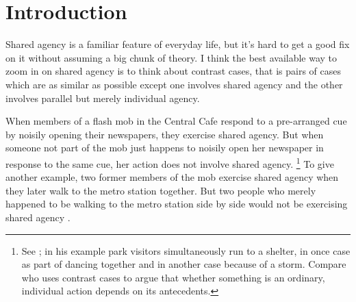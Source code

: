 \documentclass[12pt,\papersize]{extarticle}
\begin{document}
%
%
%
%




\section{Introduction}
Shared agency is a familiar feature of everyday life, but it's hard to get a good fix on it without assuming a big chunk of theory.
I think the best available way to zoom in on shared agency is to think about contrast cases, that is pairs of cases which are as similar as possible except one involves shared agency and the other involves parallel but merely individual agency.

When members of a flash mob in the Central Cafe respond to a pre-arranged cue by noisily opening their newspapers, they exercise shared agency. 
But when someone not part of the mob just happens to noisily open her newspaper in response to the same cue, her action does not involve shared agency.%
\footnote{
See \citet{Searle:1990em}; in his example park visitors simultaneously run to a shelter, in once case as part of dancing together and in another case because of a storm. 
Compare \citet{Pears:1971fk} who uses contrast cases to argue that whether something is an ordinary, individual action depends on its antecedents. 
}
To give another example, 
 two former members of the mob exercise shared agency when they 
   later walk to the metro station together. 
But two people who merely happened to be walking to the metro station side by side would not be exercising shared agency \citep{gilbert_walking_1990}. 
\end{document}
